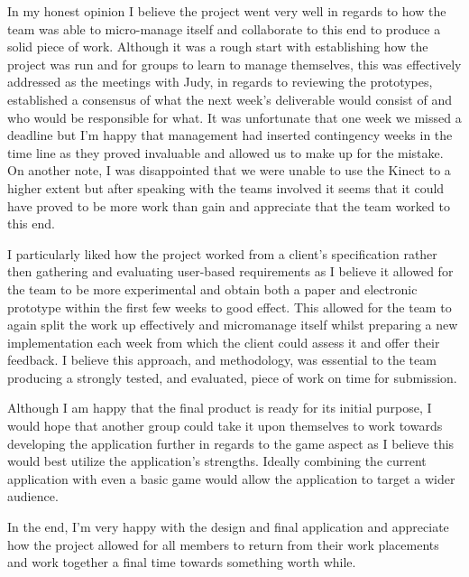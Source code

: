 In my honest opinion I believe the project went very well in regards to how the team was able to micro-manage itself and collaborate to this end to produce a solid piece of work. Although it was a rough start with establishing how the project was run and for groups to learn to manage themselves, this was effectively addressed as the meetings with Judy, in regards to reviewing the prototypes, established a consensus of what the next week's deliverable would consist of and who would be responsible for what. It was unfortunate that one week we missed a deadline but I'm happy that management had inserted contingency weeks in the time line as they proved invaluable and allowed us to make up for the mistake. On another note, I was disappointed that we were unable to use the Kinect to a higher extent but after speaking with the teams involved it seems that it could have proved to be more work than gain and appreciate that the team worked to this end.

I particularly liked how the project worked from a client's specification rather then gathering and evaluating user-based requirements as I believe it allowed for the team to be more experimental and obtain both a paper and electronic prototype within the first few weeks to good effect. This allowed for the team to again split the work up effectively and micromanage itself whilst preparing a new implementation each week from which the client could assess it and offer their feedback. I believe this approach, and methodology, was essential to the team producing a strongly tested, and evaluated, piece of work on time for submission.

Although I am happy that the final product is ready for its initial purpose, I would hope that another group could take it upon themselves to work towards developing the application further in regards to the game aspect as I believe this would best utilize the application's strengths. Ideally combining the current application with even a basic game would allow the application to target a wider audience.

In the end, I'm very happy with the design and final application and appreciate how the project allowed for all members to return from their work placements and work together a final time towards something worth while.
